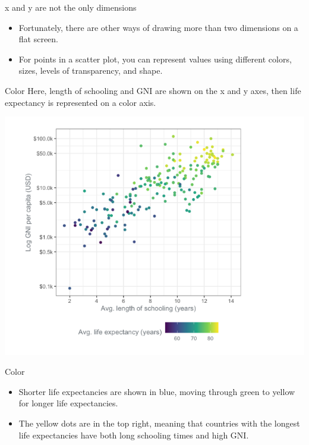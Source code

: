 \documentclass[
  ignorenonframetext,
]{beamer}
\begin{document}
\begin{frame}{x and y are not the only dimensions}
\label{x-and-y-are-not-the-only-dimensions}
\begin{itemize}
\item
  Fortunately, there are other ways of drawing more than two dimensions
  on a flat screen.
\item
  For points in a scatter plot, you can represent values using different
  colors, sizes, levels of transparency, and shape.
\end{itemize}
\end{frame}

\begin{frame}{Color}
\label{color}
Here, length of schooling and GNI are shown on the x and y axes, then
life expectancy is represented on a color axis.

\includegraphics{../images/im66.png}
\end{frame}

\begin{frame}{Color}
\label{color-1}
\begin{itemize}
\item
  Shorter life expectancies are shown in blue, moving through green to
  yellow for longer life expectancies.
\item
  The yellow dots are in the top right, meaning that countries with the
  longest life expectancies have both long schooling times and high GNI.
\end{itemize}
\end{frame}
\end{document}
